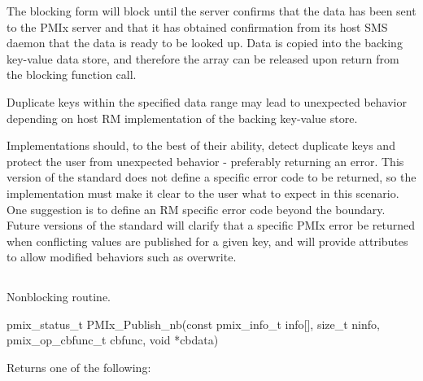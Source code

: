 The blocking form will block until the server confirms that the data has been sent to the \ac{PMIx} server and that it has obtained confirmation from its host \ac{SMS} daemon that the data is ready to be looked up. Data is copied into the backing key-value data store, and therefore the  array can be released upon return from the blocking function call.

\adviceuserstart
Duplicate keys within the specified data range may lead to unexpected behavior depending
on host RM implementation of the backing key-value store.
\adviceuserend

\adviceimplstart
Implementations should, to the best of their ability, detect duplicate keys and protect the
user from unexpected behavior - preferably returning an error. This version of the
standard does not define a specific error code to be returned, so the implementation must
make it clear to the user what to expect in this scenario. One suggestion is to define an RM
specific error code beyond the  boundary. Future versions of the standard
will clarify that a specific \ac{PMIx} error be returned when conflicting values are published for a given
key, and will provide attributes to allow modified behaviors such as overwrite.
\adviceimplend

\subsection{}

\summary

Nonblocking  routine.

\format

\cspecificstart
\begin{codepar}
pmix_status_t
PMIx_Publish_nb(const pmix_info_t info[], size_t ninfo,
                pmix_op_cbfunc_t cbfunc, void *cbdata)
\end{codepar}
\cspecificend

\begin{arglist}
\end{arglist}

Returns one of the following:

